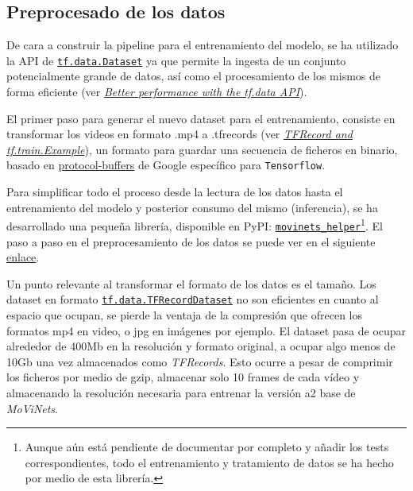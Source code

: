 \subsection{Preprocesado de los datos}

De cara a construir la pipeline para el entrenamiento del modelo, se ha utilizado la API de \href{https://www.tensorflow.org/api_docs/python/tf/data/Dataset}{\texttt{tf.data.Dataset}} ya que permite la ingesta de un conjunto potencialmente grande de datos, así como el procesamiento de los mismos de forma eficiente (ver \href{https://www.tensorflow.org/guide/data_performance}{\textit{Better performance with the tf.data API}}).

El primer paso para generar el nuevo dataset para el entrenamiento, consiste en transformar los videos en formato .mp4 a .tfrecords (ver \href{https://www.tensorflow.org/tutorials/load_data/tfrecord}{\textit{TFRecord and tf.train.Example}}), un formato para guardar una secuencia de ficheros en binario, basado en \href{https://developers.google.com/protocol-buffers/}{protocol-buffers} de Google específico para \texttt{Tensorflow}.

Para simplificar todo el proceso desde la lectura de los datos hasta el entrenamiento del modelo y posterior consumo del mismo (inferencia), se ha desarrollado una pequeña librería, disponible en PyPI: \href{https://pypi.org/project/movinets_helper/}{\texttt{movinets\_helper}}\footnote{Aunque aún está pendiente de documentar por completo y añadir los tests correspondientes, todo el entrenamiento y tratamiento de datos se ha hecho por medio de esta librería.}. El paso a paso en el preprocesamiento de los datos se puede ver en el siguiente \href{https://plaguss.github.io/movinets_helper/how-to-guides/#how-to-create-a-dataset}{enlace}.

Un punto relevante al transformar el formato de los datos es el tamaño. Los dataset en formato \href{https://www.tensorflow.org/api_docs/python/tf/data/TFRecordDataset}{\texttt{tf.data.TFRecordDataset}} no son eficientes en cuanto al espacio que ocupan, se pierde la ventaja de la compresión que ofrecen los formatos mp4 en video, o jpg en imágenes por ejemplo. El dataset pasa de ocupar alrededor de 400Mb en la resolución y formato original, a ocupar algo menos de 10Gb una vez almacenados como \textit{TFRecords}. Esto ocurre a pesar de comprimir los ficheros por medio de gzip, almacenar solo 10 frames de cada vídeo y almacenando la resolución necesaria para entrenar la versión a2 base de \textit{MoViNets}.

